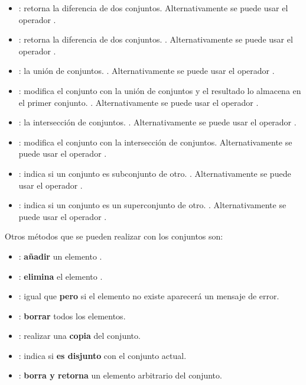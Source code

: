 \begin{itemize}
\item {}: retorna la diferencia de dos conjuntos. 
Alternativamente se puede usar el operador \cm{-}.

\item {}: retorna la diferencia de dos conjuntos. . Alternativamente se puede usar el operador \cm{-=}.


\item {}: la unión de conjuntos. .
Alternativamente se puede usar el operador \cm{|}.

\item {}: modifica el conjunto con la unión de conjuntos y el resultado lo almacena en el primer conjunto. . Alternativamente se puede usar el operador \cm{|=}.

\item {}: la intersección de conjuntos. .
Alternativamente se puede usar el operador \cm{\&}.

\item {}: modifica el conjunto con la intersección de conjuntos. 
Alternativamente se puede usar el operador \cm{\&=}.

\item {}: indica si un conjunto es subconjunto de otro. .
Alternativamente se puede usar el operador \cm{$<=$}.


\item {}: indica si un conjunto es un superconjunto de otro. . Alternativamente se puede usar el operador \cm{$>=$}.


\end{itemize}






\noindent Otros métodos que se pueden realizar con los conjuntos son:

\begin{itemize}
\item {}: \textbf{añadir} un elemento . 
\item {}: \textbf{elimina} el elemento .
\item {}: igual que  \textbf{pero} si el elemento no existe aparecerá un mensaje de error.
\item {}: \textbf{borrar} todos los elementos. 
\item {}: realizar una \textbf{copia} del conjunto.
\item {}: indica si  \textbf{es disjunto} con el conjunto actual.
\item {}: \textbf{borra y retorna} un elemento arbitrario del conjunto. 
\end{itemize}




